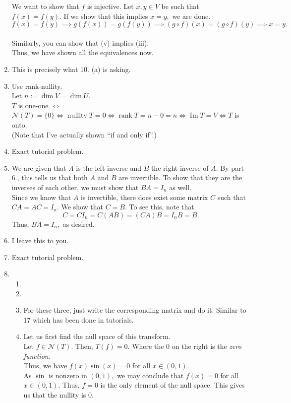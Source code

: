 \documentclass{article}
\newcommand{\rank}{\operatorname{rank}}
\renewcommand{\Im}{\operatorname{Im}}
\newcommand{\nullity}{\operatorname{nullity}}
\begin{document}
\begin{enumerate}
	We want to show that $f$ is injective. Let $x, y \in V$ be such that $f(x) = f(y).$ If we show that this implies $x = y,$ we are done.\\
	$f(x) = f(y) \implies g(f(x)) = g(f(y)) \implies (g\circ f)(x) = (g\circ f)(y) \implies x = y.$\\~\\
	Similarly, you can show that (v) implies (iii).\\
	Thus, we have shown all the equivalences now.
	\item This is precisely what 10. (a) is asking.
	\item Use rank-nullity.\\
	Let $n := \dim V = \dim U.$\\
	$T$ is one-one $\iff$ $\mathcal{N}(T) = \{0\} \iff \nullity T = 0 \iff \rank T = n - 0 = n \iff \Im T = V \iff T$ is onto.\\
	(Note that I've actually shown ``if and only if''.)
	\item Exact tutorial problem.
	\item We are given that $A$ is the left inverse and $B$ the right inverse of $A.$ By part 6., this tells us that both $A$ and $B$ are invertible. To show that they are the inverses of each other, we must show that $BA = I_n$ as well.\\
	Since we know that $A$ is invertible, there does exist some matrix $C$ such that $CA = AC = I_n.$ We show that $C = B.$ To see this, note that
	\[C = CI_n = C(AB) = (CA)B = I_nB = B.\]
	Thus, $BA = I_n,$ as desired.
	\item I leave this to you.
	\item Exact tutorial problem.
	\item 
	\begin{enumerate}[label=(\alph*)] 
		\item 
		\item 
		\item For these three, just write the corresponding matrix and do it. Similar to 17 which has been done in tutorials.
		\item Let us first find the null space of this transform.\\
		Let $f \in \mathcal{N}(T).$ Then, $T(f) = 0.$ Where the $0$ on the right is the \emph{zero function.}\\
		Thus, we have $f(x)\sin(x) = 0$ for all $x \in (0, 1).$\\
		As $\sin$ is nonzero in $(0, 1),$ we may conclude that $f(x) = 0$ for all $x \in (0, 1).$ Thus, $f = 0$ is the only element of the null space. This gives us that the nullity is $0.$\\~\\

\end{enumerate}
\end{enumerate}
\end{document}
